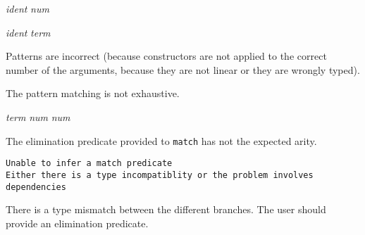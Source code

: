 \begin{ErrMsgs}
\item {} {\sl
    ident}  {\sl num} 
  
  {\sl ident}  {\sl term}
  
  {\term}
  {\term} 

 Patterns are incorrect (because constructors are not applied to
  the correct number of the arguments, because they are not linear or
  they are wrongly typed).

\item {}

The pattern matching is not exhaustive.

\item {} {\sl term}  {\sl num}  {\sl
    num} 

The elimination predicate provided to \texttt{match} has not the
  expected arity.



 
  
\item {\tt Unable to infer a match predicate\\
    Either there is a type incompatiblity or the problem involves\\
    dependencies}
 
  There is a type mismatch between the different branches.
  The user should provide an elimination predicate.


\end{ErrMsgs}
